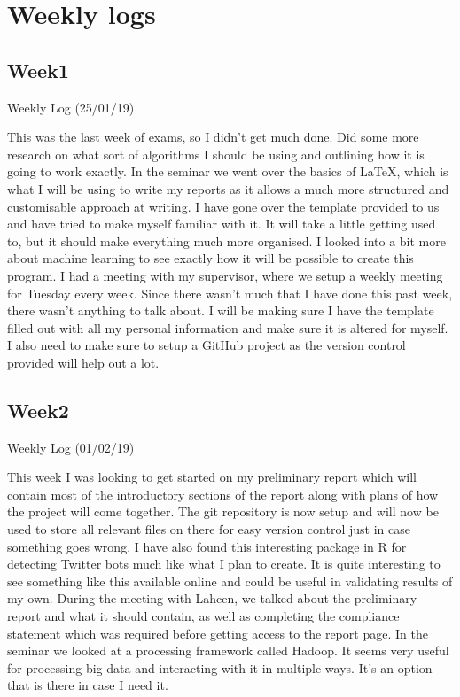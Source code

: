 
\chapter{Weekly logs}

\label{AppendixB}

\section{Week1}
Weekly Log (25/01/19)

This was the last week of exams, so I didn’t get much done. Did some more research on what sort of algorithms I should be using and outlining how it is going to work exactly. In the seminar we went over the basics of LaTeX, which is what I will be using to write my reports as it allows a much more structured and customisable approach at writing. I have gone over the template provided to us and have tried to make myself familiar with it. It will take a little getting used to, but it should make everything much more organised. I looked into a bit more about machine learning to see exactly how it will be possible to create this program. 
I had a meeting with my supervisor, where we setup a weekly meeting for Tuesday every week. Since there wasn’t much that I have done this past week, there wasn’t anything to talk about. 
I will be making sure I have the template filled out with all my personal information and make sure it is altered for myself. I also need to make sure to setup a GitHub project as the version control provided will help out a lot.

\section{Week2}
Weekly Log (01/02/19)

This week I was looking to get started on my preliminary report which will contain most of the introductory sections of the report along with plans of how the project will come together. The git repository is now setup and will now be used to store all relevant files on there for easy version control just in case something goes wrong. I have also found this interesting package in R for detecting Twitter bots much like what I plan to create. It is quite interesting to see something like this available online and could be useful in validating results of my own. 
During the meeting with Lahcen, we talked about the preliminary report and what it should contain, as well as completing the compliance statement which was required before getting access to the report page. 
In the seminar we looked at a processing framework called Hadoop. It seems very useful for processing big data and interacting with it in multiple ways. It’s an option that is there in case I need it. 

